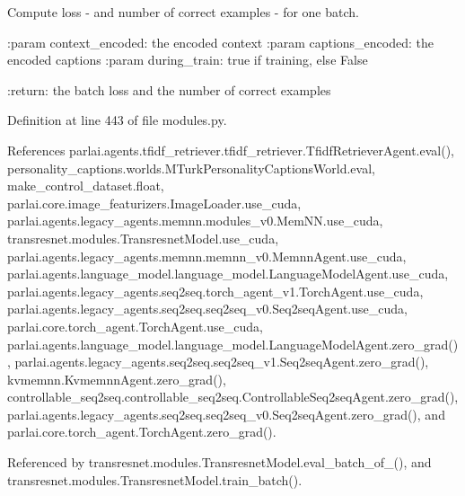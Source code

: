 \begin{DoxyVerb}Compute loss - and number of correct examples - for one batch.

:param context_encoded:
    the encoded context
:param captions_encoded:
    the encoded captions
:param during_train:
    true if training, else False

:return:
    the batch loss and the number of correct examples
\end{DoxyVerb}
 

Definition at line 443 of file modules.\+py.



References parlai.\+agents.\+tfidf\+\_\+retriever.\+tfidf\+\_\+retriever.\+Tfidf\+Retriever\+Agent.\+eval(), personality\+\_\+captions.\+worlds.\+M\+Turk\+Personality\+Captions\+World.\+eval, make\+\_\+control\+\_\+dataset.\+float, parlai.\+core.\+image\+\_\+featurizers.\+Image\+Loader.\+use\+\_\+cuda, parlai.\+agents.\+legacy\+\_\+agents.\+memnn.\+modules\+\_\+v0.\+Mem\+N\+N.\+use\+\_\+cuda, transresnet.\+modules.\+Transresnet\+Model.\+use\+\_\+cuda, parlai.\+agents.\+legacy\+\_\+agents.\+memnn.\+memnn\+\_\+v0.\+Memnn\+Agent.\+use\+\_\+cuda, parlai.\+agents.\+language\+\_\+model.\+language\+\_\+model.\+Language\+Model\+Agent.\+use\+\_\+cuda, parlai.\+agents.\+legacy\+\_\+agents.\+seq2seq.\+torch\+\_\+agent\+\_\+v1.\+Torch\+Agent.\+use\+\_\+cuda, parlai.\+agents.\+legacy\+\_\+agents.\+seq2seq.\+seq2seq\+\_\+v0.\+Seq2seq\+Agent.\+use\+\_\+cuda, parlai.\+core.\+torch\+\_\+agent.\+Torch\+Agent.\+use\+\_\+cuda, parlai.\+agents.\+language\+\_\+model.\+language\+\_\+model.\+Language\+Model\+Agent.\+zero\+\_\+grad(), parlai.\+agents.\+legacy\+\_\+agents.\+seq2seq.\+seq2seq\+\_\+v1.\+Seq2seq\+Agent.\+zero\+\_\+grad(), kvmemnn.\+Kvmemnn\+Agent.\+zero\+\_\+grad(), controllable\+\_\+seq2seq.\+controllable\+\_\+seq2seq.\+Controllable\+Seq2seq\+Agent.\+zero\+\_\+grad(), parlai.\+agents.\+legacy\+\_\+agents.\+seq2seq.\+seq2seq\+\_\+v0.\+Seq2seq\+Agent.\+zero\+\_\+grad(), and parlai.\+core.\+torch\+\_\+agent.\+Torch\+Agent.\+zero\+\_\+grad().



Referenced by transresnet.\+modules.\+Transresnet\+Model.\+eval\+\_\+batch\+\_\+of\+\_(), and transresnet.\+modules.\+Transresnet\+Model.\+train\+\_\+batch().

